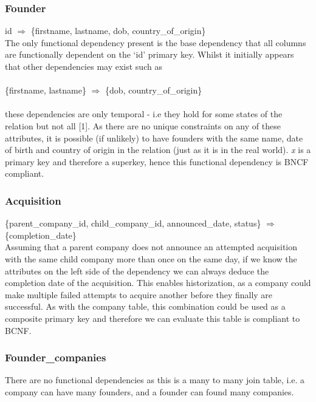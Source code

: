 \documentclass[12pt]{article}
\begin{document}
\subsubsection{Founder}
id $\Rightarrow$ \{{firstname, lastname, dob, country\_of\_origin\}}\\

The only functional dependency present is the base dependency that all columns are functionally dependent on the `id' primary key. Whilst it initially appears that other dependencies may exist such as \\\\
\{{firstname, lastname\}} $\Rightarrow$ \{{dob, country\_of\_origin\}}\\\\
these dependencies are only temporal - i.e they hold for some states of the relation but not all [1]. As there are no unique constraints on any of these attributes, it is possible (if unlikely) to have founders with the same name, date of birth and country of origin in the relation (just as it is in the real world). \emph{x} is a primary key and therefore a superkey, hence this functional dependency is BNCF compliant.

\subsubsection{Acquisition}
\{{parent\_company\_id, child\_company\_id, announced\_date, status}\} $\Rightarrow${\{completion\_date}\} \\

Assuming that a parent company does not announce an attempted acquisition with the same child company more than once on the same day, if we know the attributes on the left side of the dependency we can always deduce the completion date of the acquisition. This enables historization, as a company could make multiple failed attempts to acquire another before they finally are successful. As with the company table, this combination could be used as a composite primary key and therefore we can evaluate this table is compliant to BCNF.

\subsubsection{Founder\_companies}
There are no functional dependencies as this is a many to many join table, i.e. a company can have many founders, and a founder can found many companies.
\end{document}

